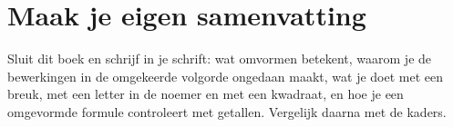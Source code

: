 \ifzelfstudie
\section*{Maak je eigen samenvatting}
Sluit dit boek en schrijf in je schrift: wat omvormen betekent, waarom je de bewerkingen in de omgekeerde volgorde ongedaan maakt, wat je doet met een breuk, met een letter in de noemer en met een kwadraat, en hoe je een omgevormde formule controleert met getallen. Vergelijk daarna met de kaders.
\fi
